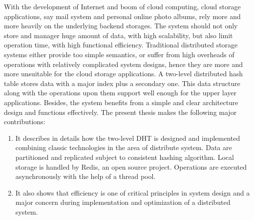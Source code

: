\begin{eabstract} 
With the development of Internet and boom of cloud computing, cloud storage
applications, say mail system and personal online photo albums, rely more and
more heavily on the underlying backend storages. The system should not only
store and manager huge amount of data, with high scalability, but also limit
operation time, with high functional efficiency. Traditional distributed
storage systems either provide too simple semantics, or suffer from high
overheads of operations with relatively complicated system designs, hence they
are more and more unsuitable for the cloud storage applications. A two-level
distributed hash table stores data with a major index plus a secondary one.
This data structure along with the operations upon them support well enough
for the upper layer applications. Besides, the system benefits from a simple
and clear architecture design and functions effectively. The present thesis
makes the following major contributions:
\begin{enumerate}
  \item It describes in details how the two-level DHT is designed and
  implemented combining classic technologies in the area of distribute system.
  Data are partitioned and replicated subject to consistent hashing algorithm.
  Local storage is handled by Redis, an open source project. Operations are
  executed asynchronously with the help of a thread pool.
  \item It also shows that efficiency is one of critical principles in system
  design and a major concern during implementation and optimization of a
  distributed system.
\end{enumerate}
\end{eabstract}

